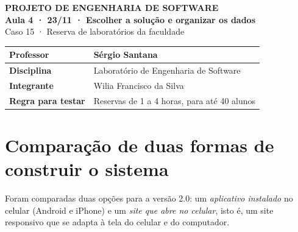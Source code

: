 \documentclass[a4paper,12pt]{article}
\begin{document}
\pagestyle{plain}

\begin{center}
  {\small\bfseries PROJETO DE ENGENHARIA DE SOFTWARE}\\[4pt]
  {\fontsize{16}{20}\selectfont\bfseries Aula 4 · 23/11 · Escolher a solução e organizar os dados}\\[6pt]
  {\large Caso 15 · Reserva de laboratórios da faculdade}
\end{center}

\vspace{6pt}

\begin{xltabular}{\linewidth}{|l|Y|}
  \hline
  \textbf{Professor} & Sérgio Santana \\ \hline
  \textbf{Disciplina} & Laboratório de Engenharia de Software \\ \hline
  \textbf{Integrante} & Wilia Francisco da Silva \\ \hline
  \textbf{Regra para testar} & Reservas de 1 a 4 horas, para até 40 alunos \\ \hline
\end{xltabular}

\section{Comparação de duas formas de construir o sistema}

Foram comparadas duas opções para a versão 2.0: um \emph{aplicativo
instalado} no celular (Android e iPhone) e um \emph{site que abre no
celular}, isto é, um site responsivo que se adapta à tela do celular e
do computador.
\end{document}
